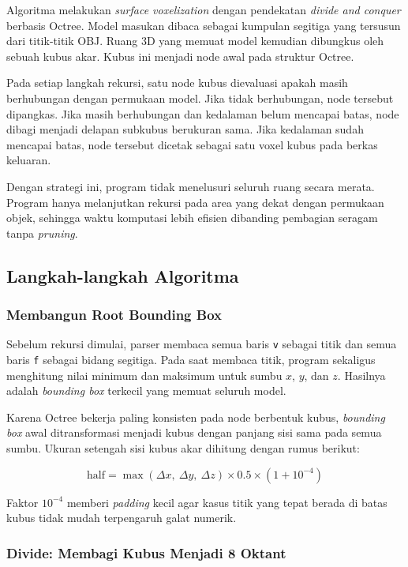 \documentclass{article}
\begin{document}
Algoritma melakukan \textit{surface voxelization} dengan pendekatan \textit{divide and conquer}
berbasis Octree. Model masukan dibaca sebagai kumpulan segitiga yang tersusun dari titik-titik
OBJ. Ruang 3D yang memuat model kemudian dibungkus oleh sebuah kubus akar. Kubus ini menjadi
node awal pada struktur Octree.

Pada setiap langkah rekursi, satu node kubus dievaluasi apakah masih berhubungan dengan
permukaan model. Jika tidak berhubungan, node tersebut dipangkas. Jika masih berhubungan dan
kedalaman belum mencapai batas, node dibagi menjadi delapan subkubus berukuran sama.
Jika kedalaman sudah mencapai batas, node tersebut dicetak sebagai satu voxel kubus pada
berkas keluaran.

Dengan strategi ini, program tidak menelusuri seluruh ruang secara merata. Program hanya
melanjutkan rekursi pada area yang dekat dengan permukaan objek, sehingga waktu komputasi
lebih efisien dibanding pembagian seragam tanpa \textit{pruning}.

\subsection{Langkah-langkah Algoritma}

\subsubsection{Membangun Root Bounding Box}

Sebelum rekursi dimulai, parser membaca semua baris \texttt{v} sebagai titik dan semua baris
\texttt{f} sebagai bidang segitiga. Pada saat membaca titik, program sekaligus menghitung nilai
minimum dan maksimum untuk sumbu $x$, $y$, dan $z$. Hasilnya adalah \textit{bounding box}
terkecil yang memuat seluruh model.

Karena Octree bekerja paling konsisten pada node berbentuk kubus, \textit{bounding box} awal
ditransformasi menjadi kubus dengan panjang sisi sama pada semua sumbu. Ukuran setengah sisi
kubus akar dihitung dengan rumus berikut:

\[
\text{half} = \max(\Delta x,\ \Delta y,\ \Delta z) \times 0.5 \times (1 + 10^{-4})
\]

Faktor $10^{-4}$ memberi \textit{padding} kecil agar kasus titik yang tepat berada di batas
kubus tidak mudah terpengaruh galat numerik.

\subsubsection{Divide: Membagi Kubus Menjadi 8 Oktant}
\end{document}
